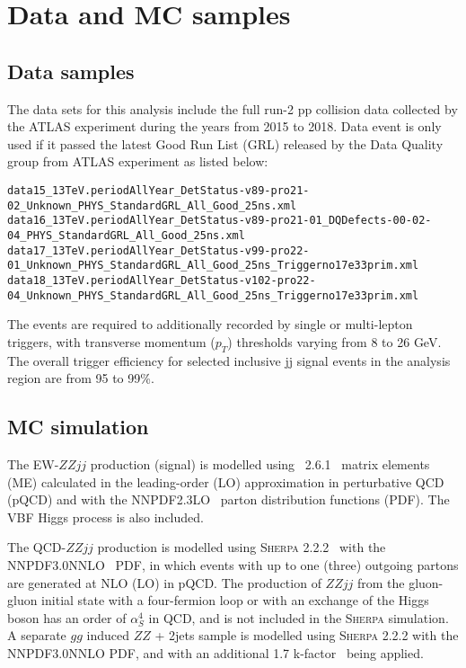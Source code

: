 \section{Data and MC samples}

\subsection{Data samples}

The data sets for this analysis include the full run-2 pp collision data collected by the ATLAS experiment during the years from 2015 to 2018.
Data event is only used if it passed the latest Good Run List (GRL) released by the Data Quality group from ATLAS experiment as listed below:


{\tiny
\begin{verbatim}
data15_13TeV.periodAllYear_DetStatus-v89-pro21-02_Unknown_PHYS_StandardGRL_All_Good_25ns.xml
data16_13TeV.periodAllYear_DetStatus-v89-pro21-01_DQDefects-00-02-04_PHYS_StandardGRL_All_Good_25ns.xml
data17_13TeV.periodAllYear_DetStatus-v99-pro22-01_Unknown_PHYS_StandardGRL_All_Good_25ns_Triggerno17e33prim.xml
data18_13TeV.periodAllYear_DetStatus-v102-pro22-04_Unknown_PHYS_StandardGRL_All_Good_25ns_Triggerno17e33prim.xml
\end{verbatim}
}

The events are required to additionally recorded by single or multi-lepton triggers, with transverse momentum ($p_{T}$) thresholds varying from 8 to 26 GeV.
The overall trigger efficiency for selected inclusive \llll jj signal events in the analysis region are from 95 to 99\%.

\subsection{MC simulation}
\label{sec:mc}

The EW-$ZZjj$ production (signal) is modelled using \MGMCatNLO~2.6.1~\cite{Alwall:2014hca} matrix elements (ME) calculated in the leading-order (LO) approximation
in perturbative QCD (pQCD) and with the NNPDF2.3LO~\cite{Ball:2012cx} parton distribution functions (PDF).
The VBF Higgs process is also included.

The QCD-$ZZjj$ production is modelled using \textsc{Sherpa} 2.2.2~\cite{Gleisberg:2008ta} with the NNPDF3.0NNLO~\cite{ball2015parton} PDF,
in which events with up to one (three) outgoing partons are generated at NLO (LO) in pQCD.
The production of $ZZjj$ from the gluon-gluon initial state with a four-fermion loop or with an exchange of the Higgs boson has an order of $\alpha_{S}^{4}$ in QCD,
and is not included in the \textsc{Sherpa} simulation.
A separate $gg$ induced $ZZ$ + 2jets sample is modelled using \textsc{Sherpa} 2.2.2 with the NNPDF3.0NNLO PDF,
and with an additional 1.7 k-factor~\cite{PhysRevD.92.094028} being applied.

